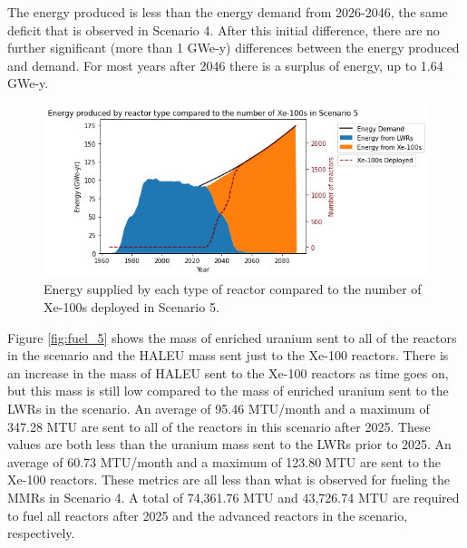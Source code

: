 The energy produced is less than the energy demand from 
2026-2046, the same deficit that is observed in Scenario 4. After this 
initial difference, there are no further significant (more than 
1 GWe-y) differences between 
the energy produced and demand. For most years after 2046 there 
is a surplus of energy, up to 1.64 GWe-y. 

\begin{figure}
    \centering 
    \includegraphics[width=\textwidth]{../figures/energy_scenario5.png}
    \caption{Energy supplied by each type of reactor compared to the number of 
    Xe-100s deployed in Scenario 5.}
    \label{fig:energy_rx_5}
\end{figure}

Figure \ref{fig:fuel_5} shows the mass of enriched uranium sent to all of 
the reactors in the scenario and the \gls{HALEU} mass sent just to the 
Xe-100 reactors. There is an increase in the mass of \gls{HALEU} sent 
to the Xe-100 reactors as time goes on, but this mass is still  
low compared to the mass of enriched uranium sent to the \glspl{LWR} in 
the scenario. An average of 95.46 MTU/month and a maximum of 347.28 MTU 
are sent to all of the reactors in this scenario after 2025. These 
values are both less than the uranium mass sent to the 
\glspl{LWR} prior to 2025. An average of 
60.73 MTU/month and a maximum of 123.80 MTU are sent to the Xe-100 reactors. 
These metrics are all less than what is observed 
for fueling the \glspl{MMR} in Scenario 4. A total of 74,361.76 MTU and 
43,726.74 MTU are required to fuel all reactors after 2025 and the advanced reactors 
in the scenario, respectively.


